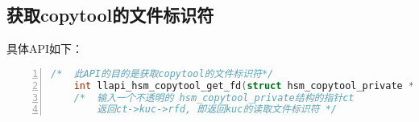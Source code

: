 \subsection{获取copytool的文件标识符}
具体API如下：
\begin{lstlisting}[language={c++},numbers=left]
    /*  此API的目的是获取copytool的文件标识符*/
    int llapi_hsm_copytool_get_fd(struct hsm_copytool_private *ct);
    /*  输入一个不透明的 hsm_copytool_private结构的指针ct
        返回ct->kuc->rfd, 即返回kuc的读取文件标识符 */
\end{lstlisting}





